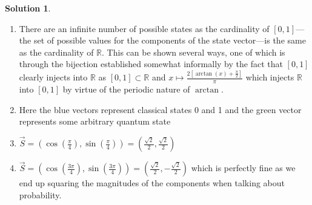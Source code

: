 \documentclass[10pt]{article}
\theoremstyle{definition}
\newtheorem{soln}{Solution}
\begin{document}
\begin{soln}~
  \begin{enumerate}[label=(\alph*)]
    \item There are an infinite number of possible states as the cardinality of $[0,1]$---the set of possible values for the components of the state vector---is the same as the cardinality of $\mathbb{R}$. This can be shown several ways,
          one of which is through the bijection established somewhat informally by the fact that $[0,1]$ clearly injects into $\mathbb{R}$ as $[0,1]\subset\mathbb{R}$
          and $x\mapsto \frac{2\left[\arctan(x)+\frac{\pi}{2}\right]}{\pi}$ which injects $\mathbb{R}$ into $[0,1]$ by virtue of the periodic nature of $\arctan$.
    \item Here the blue vectors represent classical states 0 and 1 and the green vector represents some arbitrary quantum state
          \begin{center}
          \end{center}
    \item $\displaystyle\vec{S}=\left(\cos\left(\frac{\pi}{4}\right),\sin\left(\frac{\pi}{4}\right)\right)=\left(\frac{\sqrt{2}}{2},\frac{\sqrt{2}}{2}\right)$
    \item $\displaystyle\vec{S}=\left(\cos\left(\frac{3\pi}{4}\right),\sin\left(\frac{3\pi}{4}\right)\right)=\left(\frac{\sqrt{2}}{2},-\frac{\sqrt{2}}{2}\right)$ 
    which is perfectly fine as we end up squaring the magnitudes of the components when talking about probability.
  \end{enumerate}
\end{soln}
\end{document}
